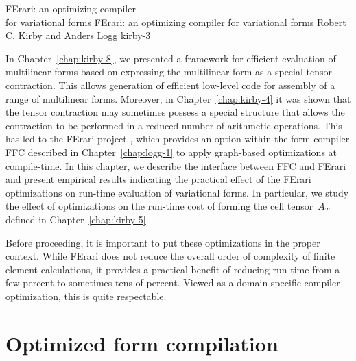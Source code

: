 \begingroup

\setcounter{chapter}{11}
\setcounter{chpnum}{11}

              {FErari: an optimizing compiler\\ for variational forms}
              {FErari: an optimizing compiler for variational forms}
              {Robert C. Kirby and Anders Logg}
              {kirby-3}


In Chapter~\ref{chap:kirby-8}, we presented a framework for efficient
evaluation of multilinear forms based on expressing the multilinear
form as a special tensor contraction. This allows generation of
efficient low-level code for assembly of a range of multilinear
forms. Moreover, in Chapter~\ref{chap:kirby-4} it was shown that the
tensor contraction may sometimes possess a special structure that
allows the contraction to be performed in a reduced number of
arithmetic operations. This has led to the FErari project
\citep{KirbyKnepleyLoggEtAl2005,KirbyLoggScottEtAl2006,KirbyScott2007,KirbyLogg2008},
which provides an option within the form compiler FFC described
in Chapter~\ref{chap:logg-1} to apply graph-based optimizations at
compile-time. In this chapter, we describe the interface between FFC and
FErari and present empirical results indicating the practical effect of
the FErari optimizations on run-time evaluation of variational forms. In
particular, we study the effect of optimizations on the run-time cost
of forming the cell tensor~$A_T$ defined in Chapter~\ref{chap:kirby-5}.

Before proceeding, it is important to put these optimizations in the
proper context. While FErari does not reduce the overall order of
complexity of finite element calculations, it provides a practical
benefit of reducing run-time from a few percent to sometimes tens of
percent. Viewed as a domain-specific compiler optimization, this is
quite respectable.

\section{Optimized form compilation}

